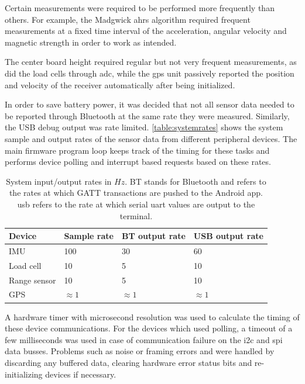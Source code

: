 Certain measurements were required to be performed more frequently than others. For example, the Madgwick \gls{ahrs} algorithm required frequent measurements at a fixed time interval of the acceleration, angular velocity and magnetic strength in order to work as intended.

The center board height required regular but not very frequent measurements, as did the load cells through \gls{adc}, while the \gls{gps} unit passively reported the position and velocity of the receiver automatically after being initialized.

In order to save battery power, it was decided that not all sensor data needed to be reported through Bluetooth at the same rate they were measured. Similarly, the USB debug output was rate limited. \autoref{table:systemrates} shows the system sample and output rates of the sensor data from different peripheral devices. The main firmware program loop keeps track of the timing for these tasks and performs device polling and interrupt based requests based on these rates.

\begin{table}[H]
\centering
\begin{tabular}{ l | l | l | l }
  Device 	& Sample rate & BT output rate 	& USB output rate\\
  \hline
  IMU 		& 100 		& 30 			& 60\\
  Load cell 	& 10 		& 5 			& 10\\
  Range sensor & 10 	& 5 			& 10\\
  GPS 		& $\approx 1$ & $\approx 1$ 	& $\approx 1$\\
\end{tabular}
\caption{System input/output rates in $Hz$. BT stands for Bluetooth and refers to the rates at which GATT transactions are pushed to the Android app. \gls{usb} refers to the rate at which serial \gls{uart} values are output to the terminal.}
\label{table:systemrates}
\end{table}

A hardware timer with microsecond resolution was used to calculate the timing of these device communications. For the devices which used polling, a timeout of a few milliseconds was used in case of communication failure on the \gls{i2c} and \gls{spi} data busses. Problems such as noise or framing errors and were handled by discarding any buffered data, clearing hardware error status bits and re-initializing devices if necessary.
